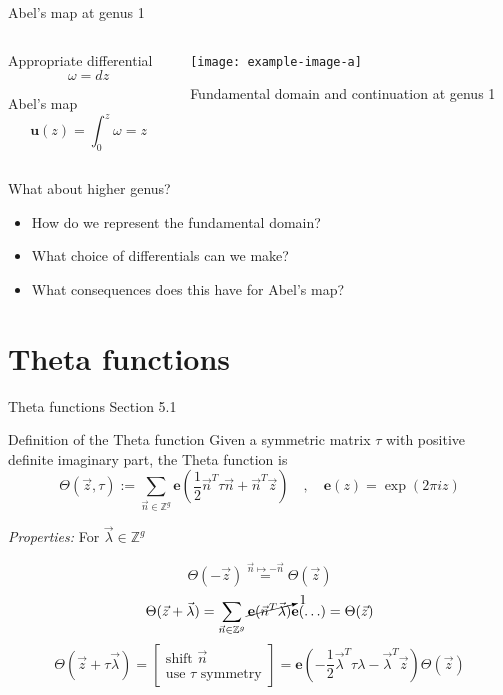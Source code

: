 \documentclass[11pt,aspectratio=169]{beamer}
\newcommand{\ee}[0]{\mathbf{e}}
\begin{document}
\begin{frame}{Abel's map at genus 1}
    \begin{columns}[onlytextwidth]
        \begin{column}{0.55\textwidth}
            Appropriate differential
            \[\omega = dz\]
            
            Abel's map
            \[\mathbf{u}(z) = \int_0^z \omega = z\]
        \end{column}
        \begin{column}{0.45\textwidth}
            \center{}
            \texttt{[image: example-image-a]}

            \tiny Fundamental domain and continuation at genus 1

            \cite{ImageSource}
        \end{column}
    \end{columns}

    {
    \begin{block}{What about higher genus?}
        \begin{itemize}
            \item How do we represent the fundamental domain?
            \item What choice of differentials can we make?
            \item What consequences does this have for Abel's map?
        \end{itemize}
    \end{block}
    }
\end{frame}

\section{Theta functions}

\begin{frame}{Theta functions}{\tiny \cite{Ber06} Section 5.1}
    \begin{block}{Definition of the Theta function}
        Given a symmetric matrix $\tau$ with positive definite imaginary part, the Theta function is
        \[\Theta(\vec z, \tau) := \sum_{\vec n \in \mathbb Z^g} \ee \left( \frac{1}{2} \vec n^T \tau \vec n + \vec n^T \vec z \right) \quad , \quad \ee(z) = \exp(2\pi i z)\]
    \end{block}
    \emph{Properties:} For $\vec \lambda \in \mathbb Z^g$

    \[\Theta(-\vec z) \overset{\vec n \mapsto -\vec n}{=} \Theta(\vec z)\]
    \[\Theta(\vec z + \vec \lambda) = \sum_{\vec n \in \mathbb Z^g} \cancelto{1}{\ee ( \vec n^T \vec \lambda)} \ee(\ldots) = \Theta(\vec z)\]
    \[\Theta(\vec z + \tau \vec \lambda) = \begin{bmatrix} \text{shift } \vec n \\ \text{use }\tau\text{ symmetry}\end{bmatrix} = \ee \left(- \frac{1}{2}\vec \lambda^T \tau \lambda-\vec \lambda^T \vec z\right)\Theta(\vec z)\]
\end{frame}
\end{document}

